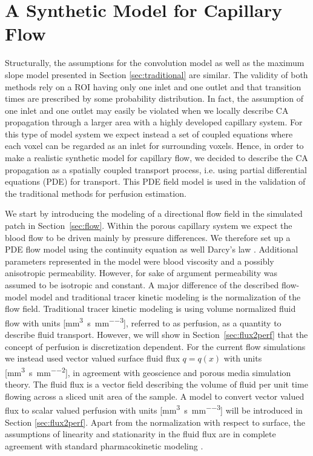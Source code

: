 \documentclass[journal,twocolumn]{IEEEtran}
\newcommand{\siQmm}{\milli\meter\cubed\per\second\per\milli\meter\cubed}
\newcommand{\siq}{\milli\meter\cubed\per\second\per\milli\meter\squared}
\begin{document}
	\section{A Synthetic Model for Capillary Flow}\label{sec:synthetic}
	
	Structurally, the assumptions for the convolution model as well as the maximum slope model presented in Section \ref{sec:traditional} are similar.
	The validity of both methods rely on a ROI having only one inlet and one outlet and that transition times are prescribed by some probability distribution.
	In fact, the assumption of one inlet and one outlet  may easily be violated when we locally describe CA propagation through a larger area with a highly developed capillary system.
	For this type of model system we expect instead a set of coupled equations where each voxel can be regarded as an inlet for surrounding voxels.
	Hence, in order to make a realistic synthetic model for capillary flow, we decided to describe the CA propagation as a spatially coupled transport process, i.e. using partial differential equations (PDE) for transport. This PDE field model is used in the validation of the traditional methods for perfusion estimation. 
	
	We start by introducing the modeling of a directional flow field in the simulated patch in Section~\ref{sec:flow}.
	Within the porous capillary system we expect the blood flow to be driven mainly by pressure differences. 
	We therefore set up a PDE flow model using the continuity equation as well Darcy's law \cite{Darcy56}.
	Additional parameters represented in the model were blood viscosity and a possibly anisotropic permeability.
	However, for sake of argument permeability was assumed to be isotropic and constant.
	A major difference of the described flow-model model and traditional tracer kinetic modeling is the normalization of the flow field.
	Traditional tracer kinetic modeling is using volume normalized fluid flow with units [\si{\siQmm}], referred to as perfusion, as a quantity to describe fluid transport. 
	However, we will show in Section~\ref{sec:flux2perf} that the concept of perfusion is discretization dependent. 
	For the current flow simulations we instead used vector valued surface fluid flux $q = q(x)$ with units [\si{\siq}], in agreement with geoscience and porous media simulation theory.
	The fluid flux is a vector field describing the volume of fluid per unit time flowing across a sliced unit area of the sample.	
	A model to convert vector valued flux to scalar valued perfusion with units [\si{\siQmm}] will be introduced in Section \ref{sec:flux2perf}.
	Apart from the normalization with respect to surface, the assumptions of linearity and stationarity in the fluid flux are in complete agreement with standard pharmacokinetic modeling \cite{sourbron13}.
	
\end{document}
